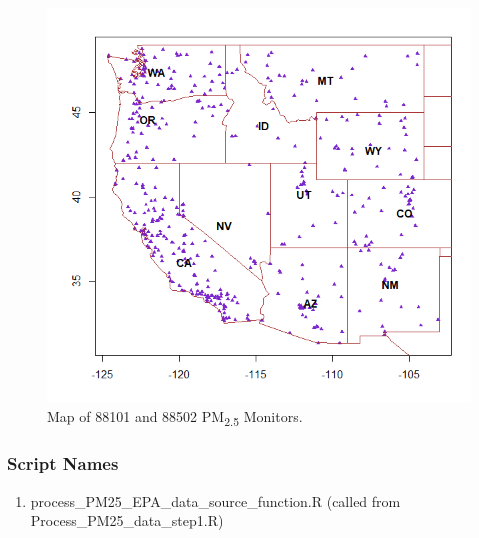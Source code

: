\begin{figure}[H] %
\includegraphics[width=1\textwidth]{m88101and88502notitlenorlabels.PNG} %
\caption{\label{fig:MapLocations}Map of 88101 and 88502 PM\textsubscript{2.5} Monitors.} %
\end{figure} %

\subsubsection*{Script Names}

\begin{enumerate}
\item process\_PM25\_EPA\_data\_source\_function.R (called from Process\_PM25\_data\_step1.R)
\end{enumerate}
